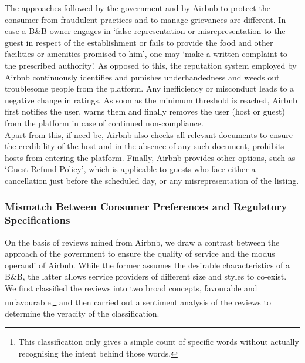 \documentclass[a4paper, 12pt, twoside]{article}
\begin{document}
The approaches followed by the government and by Airbnb to protect the consumer from fraudulent practices and to manage grievances are different. In case a B\&B owner engages in ‘false representation or misrepresentation to the guest in respect of the establishment or fails to provide the food and other facilities or amenities promised to him’, one may ‘make a written complaint to the prescribed authority’. As opposed to this, the reputation system employed by Airbnb continuously identifies and punishes underhandedness and weeds out troublesome people from the platform. Any inefficiency or misconduct leads to a negative change in ratings. As soon as the minimum threshold is reached, Airbnb first notifies the user, warns them and finally removes the user (host or guest) from the platform in case of continued non-compliance. \\

Apart from this, if need be, Airbnb also checks all relevant documents to ensure the credibility of the host and in the absence of any such document, prohibits hosts from entering the platform. Finally, Airbnb provides other options, such as ‘Guest Refund Policy’, which is applicable to guests who face either a cancellation just before the scheduled day, or any misrepresentation of the listing.



\subsubsection{Mismatch Between Consumer Preferences and Regulatory\\ Specifications}
On the basis of reviews mined from Airbnb, we draw a contrast between the approach of the government to ensure the quality of service and the modus operandi of Airbnb. While the former assumes the desirable characteristics of a B\&B, the latter allows service providers of different size and styles to co-exist. \\

We first classified the reviews into two broad concepts, favourable and unfavourable,\footnote{This classification only gives a simple count of specific words without actually recognising the intent behind those words.} and then carried out a sentiment analysis of the reviews to determine the veracity of the classification. \\
\end{document}
